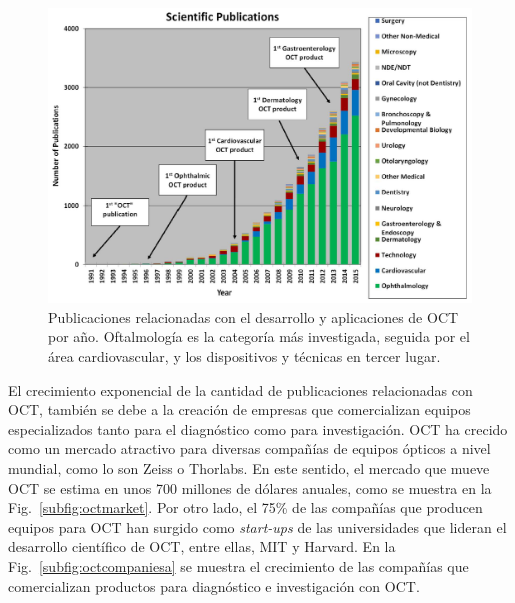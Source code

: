 \begin{figure}[ht!]
	\centering
	\includegraphics[width=0.7\linewidth]{img/chap1/oct_pub_by_year.png}
	\caption[Publicaciones de OCT por año.]{Publicaciones relacionadas con el desarrollo y aplicaciones de OCT por año. Oftalmología es la categoría más investigada, seguida por el área cardiovascular, y los dispositivos y técnicas en tercer lugar.}
	\label{fig:octpubbyyear}
\end{figure}

El crecimiento exponencial de la cantidad de publicaciones relacionadas con OCT, también se debe a la creación de empresas que comercializan equipos especializados tanto para el diagnóstico como para investigación. OCT ha crecido como un mercado atractivo para diversas compañías de equipos ópticos a nivel mundial, como lo son Zeiss o Thorlabs. En este sentido, el mercado que mueve OCT se estima en unos 700 millones de dólares anuales, como se muestra en la Fig.~\ref{subfig:octmarket}. Por otro lado, el 75\% de las compañías que producen equipos para OCT han surgido como \textit{start-ups} de las universidades que lideran el desarrollo científico de OCT, entre ellas, MIT y Harvard. En la Fig.~\ref{subfig:octcompaniesa} se muestra el crecimiento de las compañías que comercializan productos para diagnóstico e investigación con OCT.

